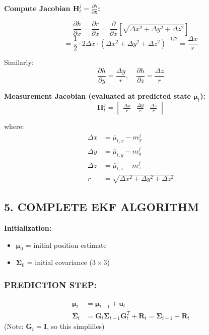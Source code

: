 \documentclass[14pt,letterpaper]{article}
\theoremstyle{definition}
\begin{document}
\textbf{Compute Jacobian $\mathbf{H}_t^j = \frac{\partial h}{\partial \mathbf{x}}$:}

\[
\frac{\partial h}{\partial x} = \frac{\partial r}{\partial x} = \frac{\partial}{\partial x}\left[\sqrt{\Delta x^2 + \Delta y^2 + \Delta z^2}\right]
\]
\[
= \frac{1}{2} \cdot 2\Delta x \cdot (\Delta x^2 + \Delta y^2 + \Delta z^2)^{-1/2} = \frac{\Delta x}{r}
\]

Similarly:
\[
\frac{\partial h}{\partial y} = \frac{\Delta y}{r}, \quad \frac{\partial h}{\partial z} = \frac{\Delta z}{r}
\]

\textbf{Measurement Jacobian (evaluated at predicted state $\bar{\boldsymbol{\mu}}_t$):}
\[
\mathbf{H}_t^j = \begin{bmatrix} \frac{\Delta x}{r} & \frac{\Delta y}{r} & \frac{\Delta z}{r} \end{bmatrix}
\]

where:
\begin{align*}
\Delta x &= \bar{\mu}_{t,x} - m_x^j \\
\Delta y &= \bar{\mu}_{t,y} - m_y^j \\
\Delta z &= \bar{\mu}_{t,z} - m_z^j \\
r &= \sqrt{\Delta x^2 + \Delta y^2 + \Delta z^2}
\end{align*}

\subsection*{5. COMPLETE EKF ALGORITHM}

\textbf{Initialization:}
\begin{itemize}
\item $\boldsymbol{\mu}_0$ = initial position estimate
\item $\boldsymbol{\Sigma}_0$ = initial covariance ($3 \times 3$)
\end{itemize}

\subsubsection*{PREDICTION STEP:}
\begin{align*}
\bar{\boldsymbol{\mu}}_t &= \boldsymbol{\mu}_{t-1} + \mathbf{u}_t \\
\bar{\boldsymbol{\Sigma}}_t &= \mathbf{G}_t \boldsymbol{\Sigma}_{t-1} \mathbf{G}_t^T + \mathbf{R}_t = \boldsymbol{\Sigma}_{t-1} + \mathbf{R}_t
\end{align*}
(Note: $\mathbf{G}_t = \mathbf{I}$, so this simplifies)
\end{document}
